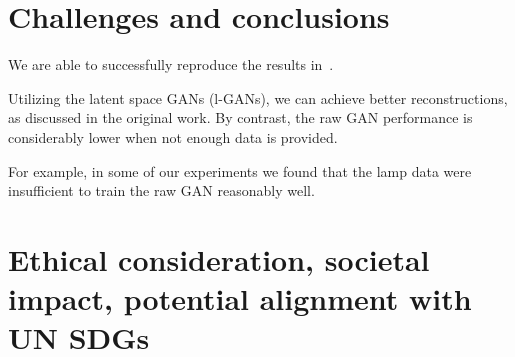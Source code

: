 \documentclass[12pt]{article}
\newcommand{\contentdescription}[1]{}
\begin{document}
    \section{Challenges and conclusions}
    \label{sec:conclusions}
    \contentdescription{
        Challenges and Conclusions (5-15\%):
        Challenges you faced when reimplementing the paper and conducting the experiments.
        Were all details in the paper?
        Or did you have to look in the authors code or even contact them to find about some details?
        Was parts of the code quite hard to get them to work as intended?
        Did you have optimize and tune several hyperparameters?
        Which ones?
        Did the framework you used make the implementation difficult in some ways?

        Summarize your key results - what have you learned?
        What points do you think one should consider when using the approach of the paper you chose for your project?
        Suggest ideas for future extensions or new applications of your ideas.
    }

    We are able to successfully reproduce the results in~\cite{pmlr-v80-achlioptas18a}.

    Utilizing the latent space GANs (l-GANs), we can achieve better reconstructions, as discussed in the original work.
    By contrast, the raw GAN performance is considerably lower when not enough data is provided.

    For example, in some of our experiments we found that the lamp data were insufficient to train the raw GAN reasonably well.


    \section{Ethical consideration, societal impact, potential alignment with UN SDGs}
    \contentdescription{
        Ethical consideration, societal impact, potential alignment with UN SDGs (5-10\%):
        Think and research!
        Are there any ethical considerations for the original paper, its problem or method, its way of conducting experiments?
        How about your task, your datasets, and the experiments you did?
        What societal impact can you imagine about the original paper and its contributions and results?
        How about your project report?
        How do you think this paper can push the UN SDG targets?
    }
\end{document}
